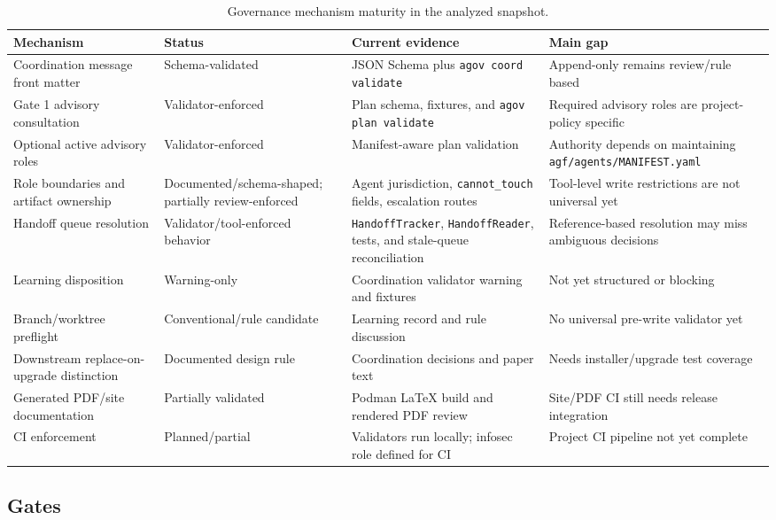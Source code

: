 \documentclass[conference]{IEEEtran}
\begin{document}
\begin{table}[t]
\caption{Governance mechanism maturity in the analyzed snapshot.}
\label{tab:maturity}
\centering
\scriptsize
\begin{tabular}{@{}p{}p{}p{}p{}@{}}
\hline
Mechanism & Status & Current evidence & Main gap \\
\hline
Coordination message front matter & Schema-validated & JSON Schema plus \texttt{agov coord validate} & Append-only remains review/rule based \\
Gate 1 advisory consultation & Validator-enforced & Plan schema, fixtures, and \texttt{agov plan validate} & Required advisory roles are project-policy specific \\
Optional active advisory roles & Validator-enforced & Manifest-aware plan validation & Authority depends on maintaining \texttt{agf/agents/MANIFEST.yaml} \\
Role boundaries and artifact ownership & Documented/schema-shaped; partially review-enforced & Agent jurisdiction, \texttt{cannot\_touch} fields, escalation routes & Tool-level write restrictions are not universal yet \\
Handoff queue resolution & Validator/tool-enforced behavior & \texttt{HandoffTracker}, \texttt{HandoffReader}, tests, and stale-queue reconciliation & Reference-based resolution may miss ambiguous decisions \\
Learning disposition & Warning-only & Coordination validator warning and fixtures & Not yet structured or blocking \\
Branch/worktree preflight & Conventional/rule candidate & Learning record and rule discussion & No universal pre-write validator yet \\
Downstream replace-on-upgrade distinction & Documented design rule & Coordination decisions and paper text & Needs installer/upgrade test coverage \\
Generated PDF/site documentation & Partially validated & Podman LaTeX build and rendered PDF review & Site/PDF CI still needs release integration \\
CI enforcement & Planned/partial & Validators run locally; infosec role defined for CI & Project CI pipeline not yet complete \\
\hline
\end{tabular}
\end{table}

\subsection{Gates}
\end{document}
